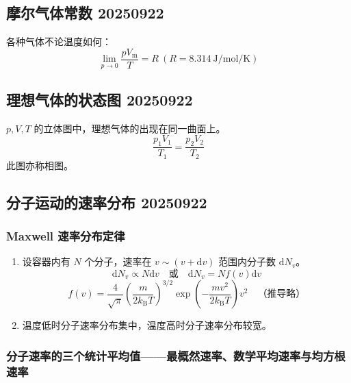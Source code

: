 \subsection{摩尔气体常数 20250922}

各种气体不论温度如何：
\begin{equation}
    \lim_{p \to 0} \frac{p V_{\mathrm{m}}}{T} = R ~ (R = \qty{8.314}{\joule\per\mole\per\kelvin})
\end{equation}

\subsection{理想气体的状态图 20250922}

$p, V, T$ 的立体图中，理想气体的出现在同一曲面上。
\begin{equation}
    \frac{p_1 V_1}{T_1} = \frac{p_2 V_2}{T_2}
\end{equation}
此图亦称相图。

\subsection{分子运动的速率分布 20250922}

\subsubsection{Maxwell 速率分布定律}

\begin{enumerate}
    \item 设容器内有 $N$ 个分子，速率在 $v \sim (v + \mathrm{d}v)$ 范围内分子数 $\mathrm{d}N_v$。
    \begin{equation*}
        \mathrm{d}N_v \propto N\mathrm{d}v \quad \text{或} \quad \mathrm{d}N_v = N f(v)\mathrm{d}v
    \end{equation*}
    \begin{equation}
        f(v) = \frac{4}{\sqrt{\pi}} \left(\frac{m}{2k_{\mathrm{B}}T}\right)^{3/2} \exp\left(-\frac{mv^2}{2k_{\mathrm{B}}T}\right) v^2 \quad \text{（推导略）}
    \end{equation}
    \item 温度低时分子速率分布集中，温度高时分子速率分布较宽。
\end{enumerate}

\subsubsection{分子速率的三个统计平均值——最概然速率、数学平均速率与均方根速率}

